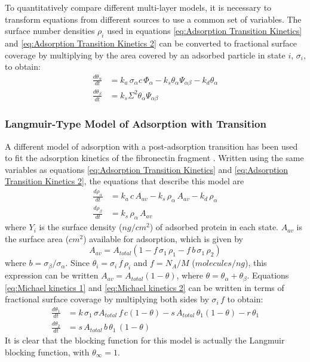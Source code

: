 To quantitatively compare different multi-layer models, it is necessary
to transform equations from different sources to use a common set
of variables. The surface number densities $\rho_{i}$ used in equations
\ref{eq:Adsorption Transition Kinetics} and \ref{eq:Adsorption Transition Kinetics 2}
can be converted to fractional surface coverage by multiplying by
the area covered by an adsorbed particle in state $i$, $\sigma_{i}$,
to obtain:\begin{align}
\frac{d\theta_{\alpha}}{dt} & =k_{a}\,\sigma_{\alpha}c\,\Phi_{\alpha}-k_{s}\theta_{\alpha}\Psi_{\alpha\beta}-k_{d}\theta_{\alpha}\label{eq:dtheta_alpha dt}\\
\frac{d\theta_{\beta}}{dt} & =k_{s}\Sigma^{2}\theta_{\alpha}\Psi_{\alpha\beta}\label{eq:dtheta_beta dt}\end{align}



\subsubsection{Langmuir-Type Model of Adsorption with Transition}

A different model of adsorption with a post-adsorption transition
has been used to fit the adsorption kinetics of the fibronectin fragment
 \cite{Lundstroem1984,Michael2003}. Written
using the same variables as equations \ref{eq:Adsorption Transition Kinetics}
and \ref{eq:Adsorption Transition Kinetics 2}, the equations that
describe this model are\begin{align}
\frac{d\rho_{\alpha}}{dt} & =k_{a}\, c\, A_{av}-k_{s}\,\rho_{\alpha}\, A_{av}-k_{d}\,\rho_{\alpha}\label{eq:Michael kinetics 1}\\
\frac{d\rho_{\beta}}{dt} & =k_{s}\,\rho_{\alpha}\, A{}_{av}\label{eq:Michael kinetics 2}\end{align}
where $Y_{i}$ is the surface density ($ng/cm^{2}$) of adsorbed protein
in each state. $A_{av}$ is the surface area ($cm^{2}$) available
for adsorption, which is given by\[
A_{av}=A_{total}\left(1-f\,\sigma_{1}\,\rho_{1}-f\, b\,\sigma_{1}\,\rho_{2}\right)\]
where $b=\sigma_{\beta}/\sigma_{\alpha}$. Since $\theta_{i}=\sigma_{i}\, f\,\rho_{i}$
and $f=N_{A}/M$ ($molecules/ng$), this expression can be written
$A_{av}=A_{total}\left(1-\theta\right)$, where $\theta=\theta_{\alpha}+\theta_{\beta}$.
Equations \ref{eq:Michael kinetics 1} and \ref{eq:Michael kinetics 2}
can be written in terms of fractional surface coverage by multiplying
both sides by $\sigma_{i}\, f$ to obtain:\begin{align}
\frac{d\theta_{1}}{dt} & =k\,\sigma_{1}\,\sigma A_{total}\, f\, c\left(1-\theta\right)-s\, A_{total}\,\theta{}_{1}\left(1-\theta\right)-r\,\theta_{1}\label{eq:Langmuir two stage 1}\\
\frac{d\theta_{2}}{dt} & =s\, A_{total}\, b\,\theta_{1}\,\left(1-\theta\right)\label{eq:Langmuir two stage 2}\end{align}
It is clear that the blocking function for this model is actually
the Langmuir blocking function, with $\theta_{\infty}=1$.


